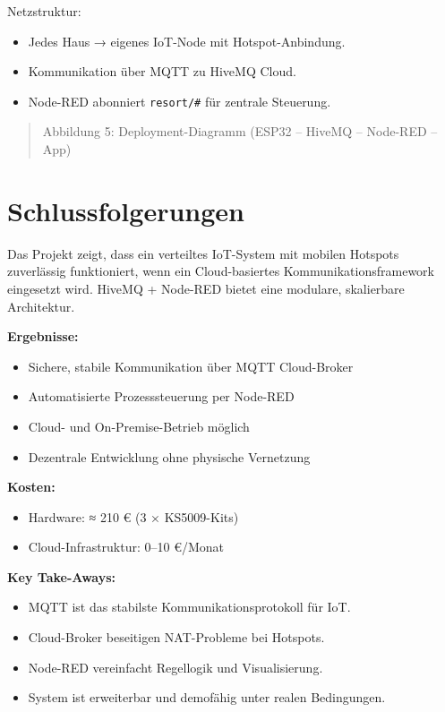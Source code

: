 \documentclass[12pt,a4paper]{article}
\begin{document}
\vspace{1em}
Netzstruktur:
\begin{itemize}[noitemsep]
  \item Jedes Haus → eigenes IoT-Node mit Hotspot-Anbindung.
  \item Kommunikation über MQTT zu HiveMQ Cloud.
  \item Node-RED abonniert \texttt{resort/\#} für zentrale Steuerung.
\end{itemize}

\begin{quote}
Abbildung 5: Deployment-Diagramm (ESP32 – HiveMQ – Node-RED – App)
\end{quote}

\section{Schlussfolgerungen}
Das Projekt zeigt, dass ein verteiltes IoT-System mit mobilen Hotspots zuverlässig funktioniert, wenn ein Cloud-basiertes Kommunikationsframework eingesetzt wird.  
HiveMQ + Node-RED bietet eine modulare, skalierbare Architektur.

\textbf{Ergebnisse:}
\begin{itemize}[noitemsep]
  \item Sichere, stabile Kommunikation über MQTT Cloud-Broker
  \item Automatisierte Prozesssteuerung per Node-RED
  \item Cloud- und On-Premise-Betrieb möglich
  \item Dezentrale Entwicklung ohne physische Vernetzung
\end{itemize}

\textbf{Kosten:}
\begin{itemize}[noitemsep]
  \item Hardware: ≈ 210 € (3 × KS5009-Kits)
  \item Cloud-Infrastruktur: 0–10 €/Monat
\end{itemize}

\textbf{Key Take-Aways:}
\begin{itemize}[noitemsep]
  \item MQTT ist das stabilste Kommunikationsprotokoll für IoT.
  \item Cloud-Broker beseitigen NAT-Probleme bei Hotspots.
  \item Node-RED vereinfacht Regellogik und Visualisierung.
  \item System ist erweiterbar und demofähig unter realen Bedingungen.
\end{itemize}

\newpage


\end{document}
